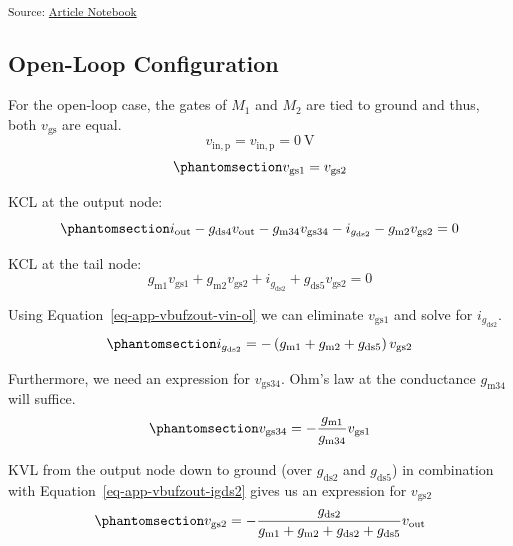 \documentclass[
  a4paper,
  DIV=11,
  numbers=noendperiod]{scrartcl}
\begin{document}
\textsubscript{Source:
\href{https://iic-jku.github.io/analog-circuit-design/index.qmd.html}{Article
Notebook}}

\subsection{Open-Loop Configuration}\label{open-loop-configuration}

For the open-loop case, the gates of \(M_1\) and \(M_2\) are tied to
ground and thus, both \(v_\mathrm{gs}\) are equal. \[
v_\mathrm{in,p}=v_\mathrm{in,p}=0~\text{V}
\] \begin{equation}\phantomsection\label{eq-app-vbufzout-vin-ol}{
v_\mathrm{gs1} = v_\mathrm{gs2}
}\end{equation}

KCL at the output node:
\begin{equation}\phantomsection\label{eq-app-vbufzout-kcl-vout-ol}{
i_\mathrm{out} -g_\mathrm{ds4} v_\mathrm{out} - g_\mathrm{m34}v_\mathrm{gs34} - i_{g_\mathrm{ds2}} - g_\mathrm{m2}v_\mathrm{gs2} = 0
}\end{equation}

KCL at the tail node: \[
g_\mathrm{m1}v_\mathrm{gs1} + g_\mathrm{m2}v_\mathrm{gs2} + i_{g_\mathrm{ds2}} + g_\mathrm{ds5}v_\mathrm{gs2} = 0
\]

Using Equation~\ref{eq-app-vbufzout-vin-ol} we can eliminate
\(v_\mathrm{gs1}\) and solve for \(i_{g_\mathrm{ds2}}\).
\begin{equation}\phantomsection\label{eq-app-vbufzout-igds2}{
i_{g_\mathrm{ds2}} = -\left(g_\mathrm{m1}+g_\mathrm{m2}+g_\mathrm{ds5}\right)v_\mathrm{gs2}
}\end{equation}

Furthermore, we need an expression for \(v_\mathrm{gs34}\). Ohm's law at
the conductance \(g_\mathrm{m34}\) will suffice.
\begin{equation}\phantomsection\label{eq-app-vbufzout-vgs34-ol}{
v_\mathrm{gs34} = -\frac{g_\mathrm{m1}}{g_\mathrm{m34}}v_\mathrm{gs1}
}\end{equation}

KVL from the output node down to ground (over \(g_\mathrm{ds2}\) and
\(g_\mathrm{ds5}\)) in combination with
Equation~\ref{eq-app-vbufzout-igds2} gives us an expression for
\(v_\mathrm{gs2}\)
\begin{equation}\phantomsection\label{eq-app-vbufzout-vgs2-ol}{
v_\mathrm{gs2} = -\frac{g_\mathrm{ds2}}{g_\mathrm{m1}+g_\mathrm{m2}+g_\mathrm{ds2}+g_\mathrm{ds5}}v_\mathrm{out}
}\end{equation}
\end{document}
